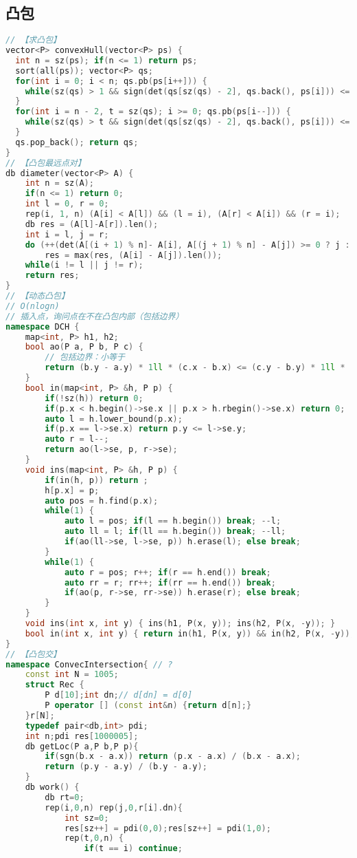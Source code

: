 \subsection{凸包}
\begin{lstlisting}[language=C++]
// 【求凸包】
vector<P> convexHull(vector<P> ps) {
  int n = sz(ps); if(n <= 1) return ps;
  sort(all(ps)); vector<P> qs;
  for(int i = 0; i < n; qs.pb(ps[i++])) {
    while(sz(qs) > 1 && sign(det(qs[sz(qs) - 2], qs.back(), ps[i])) <= 0) qs.pop_back();
  }
  for(int i = n - 2, t = sz(qs); i >= 0; qs.pb(ps[i--])) {
    while(sz(qs) > t && sign(det(qs[sz(qs) - 2], qs.back(), ps[i])) <= 0) qs.pop_back();
  }
  qs.pop_back(); return qs;
}
// 【凸包最远点对】
db diameter(vector<P> A) {
	int n = sz(A);
	if(n <= 1) return 0;
	int l = 0, r = 0;
	rep(i, 1, n) (A[i] < A[l]) && (l = i), (A[r] < A[i]) && (r = i);
	db res = (A[l]-A[r]).len();
	int i = l, j = r;
	do (++(det(A[(i + 1) % n]- A[i], A[(j + 1) % n] - A[j]) >= 0 ? j : i)) %= n,
		res = max(res, (A[i] - A[j]).len());
	while(i != l || j != r);
	return res;
}
// 【动态凸包】
// O(nlogn)
// 插入点，询问点在不在凸包内部（包括边界）
namespace DCH {
	map<int, P> h1, h2;
	bool ao(P a, P b, P c) {
		// 包括边界：小等于
		return (b.y - a.y) * 1ll * (c.x - b.x) <= (c.y - b.y) * 1ll * (b.x - a.x);
	}
	bool in(map<int, P> &h, P p) {
		if(!sz(h)) return 0;
		if(p.x < h.begin()->se.x || p.x > h.rbegin()->se.x) return 0;
		auto l = h.lower_bound(p.x);
		if(p.x == l->se.x) return p.y <= l->se.y;
		auto r = l--;
		return ao(l->se, p, r->se);
	}
	void ins(map<int, P> &h, P p) {
		if(in(h, p)) return ;
		h[p.x] = p;
		auto pos = h.find(p.x);
		while(1) {
			auto l = pos; if(l == h.begin()) break; --l;
			auto ll = l; if(ll == h.begin()) break; --ll;
			if(ao(ll->se, l->se, p)) h.erase(l); else break;
		}
		while(1) {
			auto r = pos; r++; if(r == h.end()) break;
			auto rr = r; rr++; if(rr == h.end()) break;
			if(ao(p, r->se, rr->se)) h.erase(r); else break;
		}
	}
	void ins(int x, int y) { ins(h1, P(x, y)); ins(h2, P(x, -y)); }
	bool in(int x, int y) { return in(h1, P(x, y)) && in(h2, P(x, -y)); }
}
// 【凸包交】
namespace ConvecIntersection{ // ?
	const int N = 1005;
	struct Rec {
		P d[10];int dn;// d[dn] = d[0]
		P operator [] (const int&n) {return d[n];}
	}r[N];
	typedef pair<db,int> pdi;
	int n;pdi res[1000005];
	db getLoc(P a,P b,P p){
		if(sgn(b.x - a.x)) return (p.x - a.x) / (b.x - a.x);
		return (p.y - a.y) / (b.y - a.y);
	}
	db work() {
		db rt=0;
		rep(i,0,n) rep(j,0,r[i].dn){
			int sz=0;
			res[sz++] = pdi(0,0);res[sz++] = pdi(1,0);
			rep(t,0,n) {
				if(t == i) continue;

\end{lstlisting}
